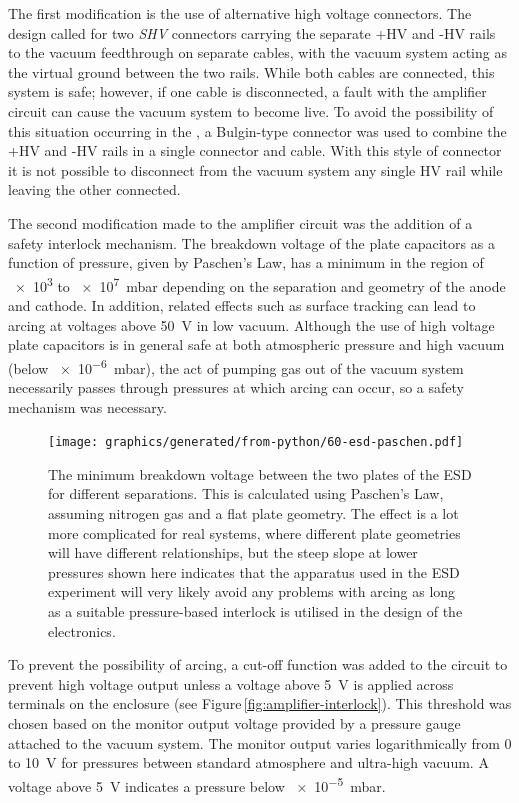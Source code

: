 The first modification is the use of alternative high voltage connectors. The \AEIPROTOTYPE{} design called for two \emph{SHV} connectors carrying the separate +\gls{HV} and -\gls{HV} rails to the vacuum feedthrough on separate cables, with the vacuum system acting as the virtual ground between the two rails. While both cables are connected, this system is safe; however, if one cable is disconnected, a fault with the amplifier circuit can cause the vacuum system to become live. To avoid the possibility of this situation occurring in the \SSM{}, a Bulgin-type connector was used to combine the +\gls{HV} and -\gls{HV} rails in a single connector and cable. With this style of connector it is not possible to disconnect from the vacuum system any single \gls{HV} rail while leaving the other connected.

The second modification made to the amplifier circuit was the addition of a safety interlock mechanism. The breakdown voltage of the plate capacitors as a function of pressure, given by Paschen's Law, has a minimum in the region of \SI{e3}{} to \SI{e7}{\milli\bar} depending on the separation and geometry of the anode and cathode. In addition, related effects such as surface tracking can lead to arcing at voltages above \SI{50}{\volt} in low vacuum. Although the use of high voltage plate capacitors is in general safe at both atmospheric pressure and high vacuum (below \SI{e-6}{\milli\bar}), the act of pumping gas out of the vacuum system necessarily passes through pressures at which arcing can occur, so a safety mechanism was necessary.

\begin{figure}
  \centering
  \texttt{[image: graphics/generated/from-python/60-esd-paschen.pdf]}
  \caption{The minimum breakdown voltage between the two plates of the \gls{ESD} for different separations. This is calculated using Paschen's Law, assuming nitrogen gas and a flat plate geometry. The effect is a lot more complicated for real systems, where different plate geometries will have different relationships, but the steep slope at lower pressures shown here indicates that the apparatus used in the \gls{ESD} experiment will very likely avoid any problems with arcing as long as a suitable pressure-based interlock is utilised in the design of the electronics.}
  \label{fig:esd-paschen}
\end{figure}

To prevent the possibility of arcing, a cut-off function was added to the circuit to prevent high voltage output unless a voltage above \SI{5}{\volt} is applied across terminals on the enclosure (see Figure\,\ref{fig:amplifier-interlock}). This threshold was chosen based on the monitor output voltage provided by a pressure gauge attached to the vacuum system. The monitor output varies logarithmically from \SI{0}{} to \SI{10}{\volt} for pressures between standard atmosphere and ultra-high vacuum. A voltage above \SI{5}{\volt} indicates a pressure below \SI{e-5}{\milli\bar}.

